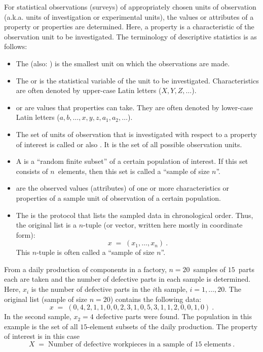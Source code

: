 \begin{MIntro}

For statistical observations (surveys) of appropriately chosen units of observation
(a.k.a. units of investigation or experimental units), the values or attributes of a property or properties are determined. 
Here, a property is a characteristic of the observation unit to be investigated. The terminology of descriptive 
statistics is as follows:

\begin{itemize}
\item{The  (also: ) 
is the smallest unit on which the observations are made.}
\item{The  or  
is the statistical variable of the unit to be investigated. Characteristics are often denoted by upper-case Latin letters 
($X, Y, Z, \ldots$).}
\item{ or  are values
that properties can take. They are often denoted by lower-case Latin letters 
($a, b,\ldots, x, y, z, a_1, a_2,\ldots$).}
\item{The set of units of observation that is investigated with respect to a property of interest 
is called  or also . It is the set of all possible 
observation units.}
\item{A  is a ``random finite subset'' of a certain population of interest. If this 
set consists of $n$~elements, then this set is called a ``sample of size $n$''.}
\item{ are the observed values (attributes) of one or more characteristics or properties 
of a sample unit of observation of a certain population.}
\item{The  is the protocol that lists the sampled data in 
chronological order. Thus, the original list is a $n$-tuple (or vector, written here mostly in coordinate form):
$$
x \;=\; (x_1,\ldots,x_n)\: .
$$
This $n$-tuple is often called a ``sample of size $n$''.}
\end{itemize}

\begin{MExample}
From a daily production of components in a factory, $n=20$~samples of $15$~parts each are taken and the number of defective parts in each sample 
is determined. Here, $x_i$ is the number of defective parts in the $i$th sample, $i=1,\ldots,20$. The original list (sample of 
size $n=20$) contains the following data:
$$
x\; =\; (0,4,2,1,1,0,0,2,3,1,0,5,3,1,1,2,0,0,1,0)\: .
$$
In the second sample, $x_2=4$ defective parts were found. The population in this example is the set of all 
$15$-element subsets of the daily production. The property of interest is in this case
$$
X\;=\; \text{Number of defective workpieces in a sample of 15~elements}\: .
$$
\end{MExample}


\end{MIntro}
